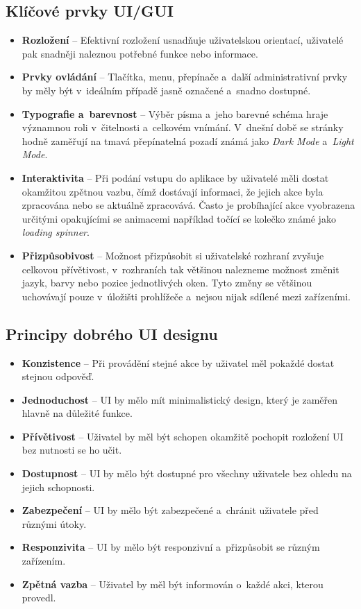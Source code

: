 \subsection*{Klíčové prvky UI/GUI}
\label{subsec:ui-gui-theory-key-elements}
\begin{itemize}
    \item \textbf{Rozložení} -- Efektivní rozložení usnadňuje uživatelskou orientací, uživatelé pak snadněji naleznou potřebné funkce nebo informace.
    \item \textbf{Prvky ovládání} -- Tlačítka, menu, přepínače a~další administrativní prvky by měly být v~ideálním případě jasně označené a~snadno dostupné.
    \item \textbf{Typografie a~barevnost} -- Výběr písma a~jeho barevné schéma hraje významnou roli v~čitelnosti a~celkovém vnímání. V~dnešní době se stránky hodně zaměřují na tmavá přepínatelná pozadí známá jako \textit{Dark Mode} a~\textit{Light Mode}.
    \item \textbf{Interaktivita} -- Při podání vstupu do aplikace by uživatelé měli dostat okamžitou zpětnou vazbu, čímž dostávají informaci, že jejich akce byla zpracována nebo se aktuálně zpracovává. Často je probíhající akce vyobrazena určitými opakujícími se animacemi například točící se kolečko známé jako \textit{loading spinner}.
    \item \textbf{Přizpůsobivost} -- Možnost přizpůsobit si uživatelské rozhraní zvyšuje celkovou přívětivost, v~rozhraních tak většinou nalezneme možnost změnit jazyk, barvy nebo pozice jednotlivých oken. Tyto změny se většinou uchovávají pouze v~úložišti prohlížeče a~nejsou nijak sdílené mezi zařízeními.
\end{itemize}

\subsection*{Principy dobrého UI designu}
\label{subsec:ui-gui-theore-basic-use-case}
\begin{itemize}
    \item \textbf{Konzistence} -- Při provádění stejné akce by uživatel měl pokaždé dostat stejnou odpověď.
    \item \textbf{Jednoduchost} -- UI by mělo mít minimalistický design, který je zaměřen hlavně na důležité funkce.
    \item \textbf{Přívětivost} -- Uživatel by měl být schopen okamžitě pochopit rozložení UI bez nutnosti se ho učit.
    \item \textbf{Dostupnost} -- UI by mělo být dostupné pro všechny uživatele bez ohledu na jejich schopnosti.
    \item \textbf{Zabezpečení} -- UI by mělo být zabezpečené a~chránit uživatele před různými útoky.
    \item \textbf{Responzivita} -- UI by mělo být responzivní a~přizpůsobit se různým zařízením.
    \item \textbf{Zpětná vazba} -- Uživatel by měl být informován o~každé akci, kterou provedl.
\end{itemize}

